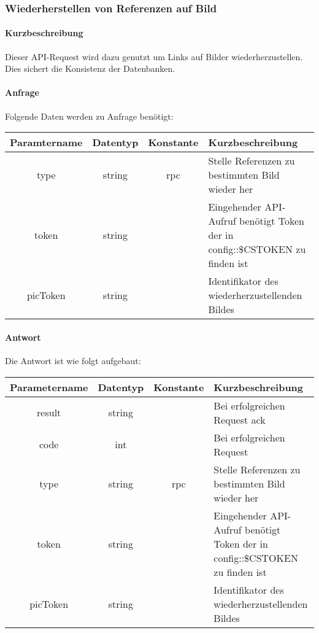 \subsubsection{Wiederherstellen von Referenzen auf Bild}
\paragraph{Kurzbeschreibung}Dieser API-Request wird dazu genutzt um Links auf Bilder wiederherzustellen. Dies sichert die Konsistenz der Datenbanken.
\paragraph{Anfrage}Folgende Daten werden zu Anfrage benötigt:
\begin{table}[H]
	\begin{tabular}{|c|c|c|p{6.5cm}|}
		\hline
		\textbf{Paramtername} & \textbf{Datentyp} & \textbf{Konstante} & \textbf{Kurzbeschreibung}                                                                                               \\ \hline
		type                & string            & rpc                & Stelle Referenzen zu bestimmten Bild wieder her \\ \hline
		token               & string            &                    & Eingehender API-Aufruf benötigt Token der in config::\$CSTOKEN zu finden ist \\ \hline
		picToken            & string            &                    & Identifikator des wiederherzustellenden Bildes \\ \hline
	\end{tabular} 
\end{table}
\paragraph{Antwort}Die Antwort ist wie folgt aufgebaut:
\begin{table}[H]
	\begin{tabular}{|c|c|c|p{6.5cm}|}
		\hline
		\textbf{Parametername} & \textbf{Datentyp} & \textbf{Konstante} & \textbf{Kurzbeschreibung}                                                                                               \\ \hline
		result              & string            &                    & Bei erfolgreichen Request {\glqq ack\grqq}                                                                            \\ \hline
		code                & int               &                    & Bei erfolgreichen Request {\glqq 0\grqq} \\ \hline
		type                & string            & rpc                & Stelle Referenzen zu bestimmten Bild wieder her \\ \hline
		token               & string            &                    & Eingehender API-Aufruf benötigt Token der in config::\$CSTOKEN zu finden ist \\ \hline
		picToken            & string            &                    & Identifikator des wiederherzustellenden Bildes \\ \hline       
	\end{tabular}
\end{table}